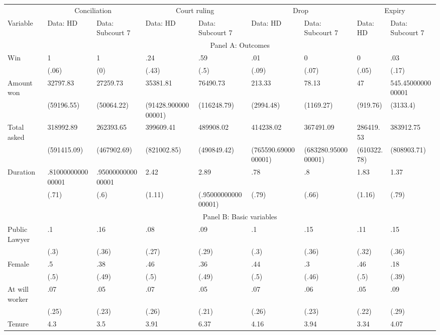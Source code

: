 \begin{tabular}{lllllllll}
\cmidrule{2-9}\multicolumn{1}{r|}{} & \multicolumn{2}{c|}{Conciliation} & \multicolumn{2}{c|}{Court ruling} & \multicolumn{2}{c|}{Drop} & \multicolumn{2}{c|}{Expiry} \\
Variable & Data: HD & Data: Subcourt 7 & Data: HD & Data: Subcourt 7 & Data: HD & Data: Subcourt 7 & Data: HD & Data: Subcourt 7 \\
\midrule
      & \multicolumn{8}{c}{Panel A: Outcomes} \\
\midrule
\midrule
Win   & 1     & 1     & .24   & .59   & .01   & 0     & 0     & .03 \\
      & (.06) & (0)   & (.43) & (.5)  & (.09) & (.07) & (.05) & (.17) \\
Amount won & 32797.83 & 27259.73 & 35381.81 & 76490.73 & 213.33 & 78.13 & 47    & 545.4500000000001 \\
      & (59196.55) & (50064.22) & (91428.90000000001) & (116248.79) & (2994.48) & (1169.27) & (919.76) & (3133.4) \\
Total asked & 318992.89 & 262393.65 & 399609.41 & 489908.02 & 414238.02 & 367491.09 & 286419.53 & 383912.75 \\
      & (591415.09) & (467902.69) & (821002.85) & (490849.42) & (765590.6900000001) & (683280.9500000001) & (610322.78) & (808903.71) \\
Duration & .8100000000000001 & .9500000000000001 & 2.42  & 2.89  & .78   & .8    & 1.83  & 1.37 \\
      & (.71) & (.6)  & (1.11) & (.9500000000000001) & (.79) & (.66) & (1.16) & (.79) \\
\midrule
      & \multicolumn{8}{c}{Panel B: Basic variables} \\
\midrule
\midrule
Public Lawyer & .1    & .16   & .08   & .09   & .1    & .15   & .11   & .15 \\
      & (.3)  & (.36) & (.27) & (.29) & (.3)  & (.36) & (.32) & (.36) \\
Female & .5    & .38   & .46   & .36   & .44   & .3    & .46   & .18 \\
      & (.5)  & (.49) & (.5)  & (.49) & (.5)  & (.46) & (.5)  & (.39) \\
At will worker & .07   & .05   & .07   & .05   & .07   & .06   & .05   & .09 \\
      & (.25) & (.23) & (.26) & (.21) & (.26) & (.23) & (.22) & (.29) \\
Tenure & 4.3   & 3.5   & 3.91  & 6.37  & 4.16  & 3.94  & 3.34  & 4.07 \\

\end{tabular}

